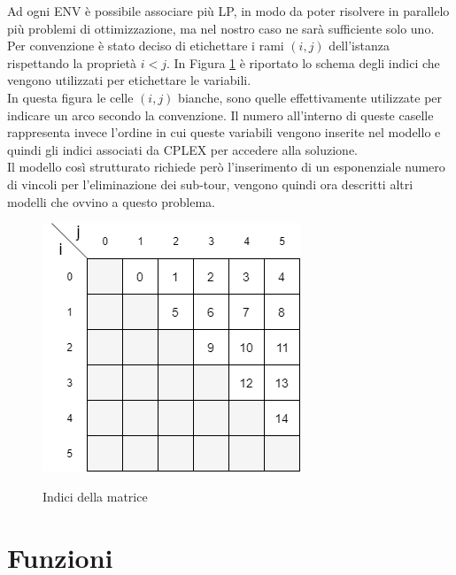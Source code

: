 Ad ogni ENV è possibile associare più LP, in modo da poter risolvere in parallelo più problemi di ottimizzazione, ma nel nostro caso ne sarà sufficiente solo uno.\\
Per convenzione è stato deciso di etichettare i rami $(i,j)$ dell'istanza rispettando la proprietà $i<j$. In Figura \ref{Indici_matrice} è riportato lo schema degli indici che vengono utilizzati per etichettare le variabili.\\
In questa figura le celle $(i,j)$ bianche, sono quelle effettivamente utilizzate per indicare un arco secondo la convenzione. Il numero all'interno di queste caselle rappresenta invece l'ordine in cui queste variabili vengono inserite nel modello e quindi gli indici associati da CPLEX per accedere alla soluzione.\\Il modello così strutturato richiede però l'inserimento di un esponenziale numero di vincoli per l'eliminazione dei sub-tour, vengono quindi ora descritti altri modelli che ovvino a questo problema.
\begin{figure}[h] 
\begin{center} 
  \includegraphics[scale=0.6]{Images/indices_matrix}\\ 
  \caption{\footnotesize{Indici della matrice}}
  \label{Indici_matrice} 
\end{center} 
\end{figure}

\section{Funzioni}
